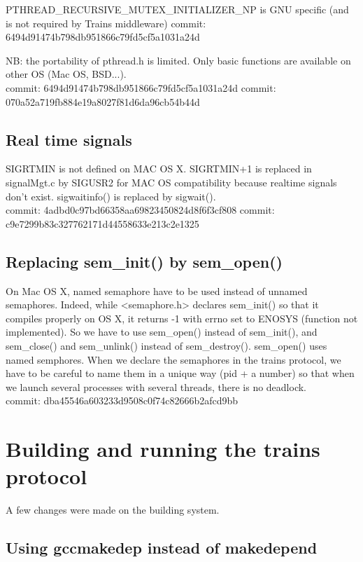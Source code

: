 \documentclass[a4paper,10pt]{report}
\begin{document}
    PTHREAD\_RECURSIVE\_MUTEX\_INITIALIZER\_NP is GNU specific (and
    is not required by Trains middleware)
    commit: 6494d91474b798db951866c79fd5cf5a1031a24d
    
    NB: the portability of pthread.h is limited. Only basic functions are
    available on other OS (Mac OS, BSD...).\\
    
    commit: 6494d91474b798db951866c79fd5cf5a1031a24d
    commit: 070a52a719fb884e19a8027f81d6da96cb54b44d 
    

\subsection{Real time signals}
    SIGRTMIN is not defined on MAC OS X.
    SIGRTMIN+1 is replaced in signalMgt.c by SIGUSR2 for MAC OS
    compatibility because realtime signals don't exist.
    sigwaitinfo() is replaced by sigwait().\\

    commit: 4adbd0c97bd66358aa69823450824d8f6f3cf808
    commit: c9e7299b83c327762171d44558633e213c2e1325

\subsection{Replacing sem\_init() by sem\_open()}
    
    On Mac OS X, named semaphore have to be used instead of unnamed
    semaphores. Indeed, while <semaphore.h> declares sem\_init() so that it
    compiles properly on OS X, it returns -1 with errno set to ENOSYS
    (function not implemented).
    So we have to use sem\_open() instead of sem\_init(), and sem\_close() and
    sem\_unlink() instead of sem\_destroy().
    sem\_open() uses named semphores. When we declare the semaphores in the trains protocol, 
    we have to be careful to name them in a unique way (pid + a number) so that when we launch
    several processes with several threads, there is no deadlock.\\
 
    commit: dba45546a603233d9508c0f74c82666b2afcd9bb

\section{Building and running the trains protocol}

A few changes were made on the building system.

\subsection{Using gccmakedep instead of makedepend} 
\end{document}
